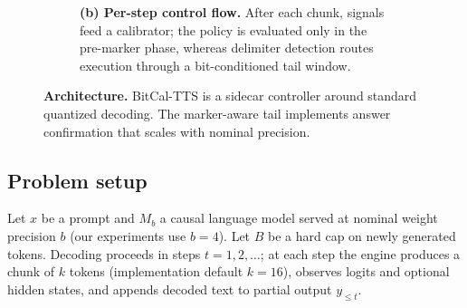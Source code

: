 \documentclass[11pt]{article}
\begin{document}
\begin{figure}[p]
\begin{subfigure}{\linewidth}
{}
  \caption{\textbf{(b) Per-step control flow.} After each chunk, signals feed a calibrator; the policy is evaluated only in the pre-marker phase, whereas delimiter detection routes execution through a bit-conditioned tail window.}
  \label{fig:arch-step}
  \end{subfigure}
  \caption{\textbf{Architecture.} BitCal-TTS is a sidecar controller around standard quantized decoding. The marker-aware tail implements answer confirmation that scales with nominal precision.}
  \label{fig:arch}
\end{figure}

\subsection{Problem setup}
Let $x$ be a prompt and $M_b$ a causal language model served at nominal weight precision $b$ (our experiments use $b{=}4$). Let $B$ be a hard cap on newly generated tokens. Decoding proceeds in steps $t{=}1,2,\ldots$; at each step the engine produces a chunk of $k$ tokens (implementation default $k{=}16$), observes logits and optional hidden states, and appends decoded text to partial output $y_{\le t}$.
\end{document}
